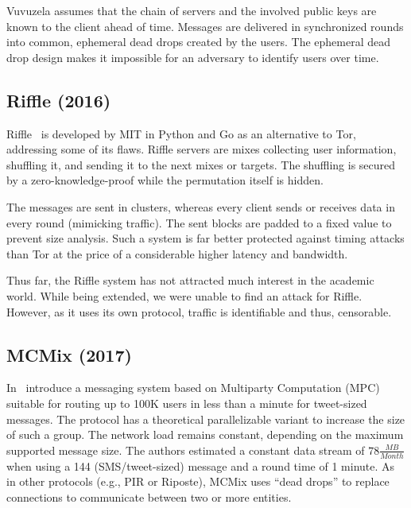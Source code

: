 Vuvuzela assumes that the chain of servers and the involved public keys are known to the client ahead of time. Messages are delivered in synchronized rounds into common, ephemeral dead drops created by the users. The ephemeral dead drop design makes it impossible for an adversary to identify users over time. 

\subsection{Riffle (2016)} %
Riffle~\cite{kwon2016riffle} is developed by MIT in Python and Go as an alternative to Tor, addressing some of its flaws. Riffle servers are mixes collecting user information, shuffling it, and sending it to the next mixes or targets. The shuffling is secured by a zero-knowledge-proof while the permutation itself is hidden.

The messages are sent in clusters, whereas every client sends or receives data in every round (mimicking traffic). The sent blocks are padded to a fixed value to prevent size analysis. Such a system is far better protected against timing attacks than Tor at the price of a considerable higher latency and bandwidth. 

Thus far, the Riffle system has not attracted much interest in the academic world. While being extended, we were unable to find an attack for Riffle. However, as it uses its own protocol, traffic is identifiable and thus, censorable.

%

%

%

\subsection{MCMix (2017)}
In~\cite{alexopoulos2017mcmix} \citeauthor{alexopoulos2017mcmix} introduce a messaging system based on Multiparty Computation (MPC) suitable for routing up to 100K users in less than a minute for tweet-sized messages. The protocol has a theoretical parallelizable variant to increase the size of such a group. The network load remains constant, depending on the maximum supported message size. The authors estimated a constant data stream of $78 \frac{MB}{Month}$ when using a 144 (SMS/tweet-sized) message and a round time of 1 minute. As in other protocols (e.g., PIR or Riposte), MCMix uses ``dead drops'' to replace connections to communicate between two or more entities. 

